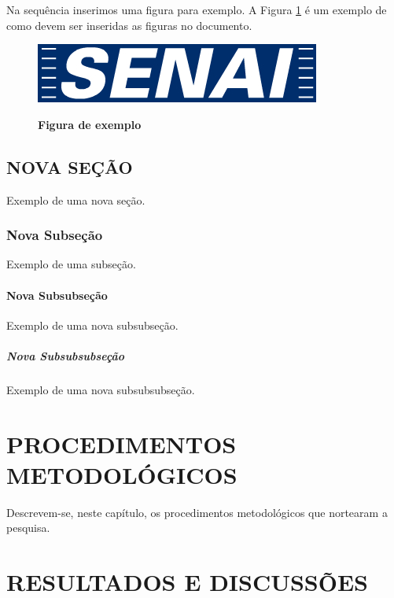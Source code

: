 \documentclass[
	12pt,				%
	openright,			%
	oneside,			%
	a4paper,			%
	chapter=TITLE,		%
	section=TITLE,		%
	brazil				%
	]{abntex2}
\begin{document}
Na sequência inserimos uma figura para exemplo. A Figura \ref{fig-exemplo} é um exemplo de como devem ser inseridas as figuras no documento.

\begin{figure}[htb]
  \begin{center}
    \caption{\textbf{Figura de exemplo}}\label{fig-exemplo}
    \includegraphics [scale=0.6]{logo-senai.jpg}
    \label{fig-exemplo}
  \end{center}
\end{figure}

\section{NOVA SEÇÃO}

Exemplo de uma nova seção.

\subsection{Nova Subseção}

Exemplo de uma subseção.

\subsubsection{Nova Subsubseção}

Exemplo de uma nova subsubseção.



\paragraph{Nova Subsubsubseção}

Exemplo de uma nova subsubsubseção.

\chapter{PROCEDIMENTOS METODOLÓGICOS}

Descrevem-se, neste capítulo, os procedimentos metodológicos que nortearam a pesquisa.

\chapter{RESULTADOS E DISCUSSÕES}
\end{document}

